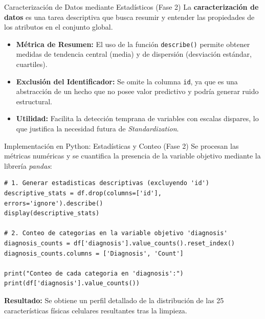 \documentclass{beamer}
\begin{document}
	\begin{frame}{Caracterización de Datos mediante Estadísticos (Fase 2)}
		La \textbf{caracterización de datos} es una tarea descriptiva que busca resumir y entender las propiedades de los atributos en el conjunto global.
		
		\begin{itemize}
			\item<2-> \textbf{Métrica de Resumen:} El uso de la función \texttt{describe()} permite obtener medidas de tendencia central (media) y de dispersión (desviación estándar, cuartiles).
			\item<3-> \textbf{Exclusión del Identificador:} Se omite la columna \texttt{id}, ya que es una abstracción de un hecho que no posee valor predictivo y podría generar ruido estructural.
			\item<4-> \textbf{Utilidad:} Facilita la detección temprana de variables con escalas dispares, lo que justifica la necesidad futura de \textit{Standardization}.
		\end{itemize}
	\end{frame}
	
	\begin{frame}[fragile]{Implementación en Python: Estadísticas y Conteo (Fase 2)}
		Se procesan las métricas numéricas y se cuantifica la presencia de la variable objetivo mediante la librería \textit{pandas}:
		
		\begin{lstlisting}[style=colab]
# 1. Generar estadisticas descriptivas (excluyendo 'id')
descriptive_stats = df.drop(columns=['id'], errors='ignore').describe()
display(descriptive_stats)

# 2. Conteo de categorias en la variable objetivo 'diagnosis'
diagnosis_counts = df['diagnosis'].value_counts().reset_index()
diagnosis_counts.columns = ['Diagnosis', 'Count']

print("Conteo de cada categoria en 'diagnosis':")
print(df['diagnosis'].value_counts())
		\end{lstlisting}
		
		\textbf{Resultado:} Se obtiene un perfil detallado de la distribución de las 25 características físicas celulares resultantes tras la limpieza.
	\end{frame}
	
\end{document}
